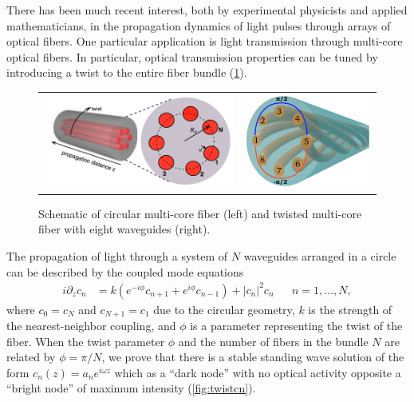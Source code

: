\documentclass[12pt,reqno,oneside]{article}
\begin{document}
There has been much recent interest, both by experimental physicists and applied mathematicians, in the propagation dynamics of light pulses through arrays of optical fibers. One particular application is light transmission through multi-core optical fibers. In particular, optical transmission properties can be tuned by introducing a twist to the entire fiber bundle \cite{Longhi2016,CastroCastro2016,Parto2017} (\cref{fig:twist}).
\begin{figure}[H]
\begin{center}
\begin{tabular}{cc}
\includegraphics[width=7.5cm]{images/twist2.png} &
\includegraphics[width=5cm]{images/twistmulticore.png}
\end{tabular}
\end{center}
\caption{Schematic of circular multi-core fiber \cite{Longhi2016} (left) and twisted multi-core fiber with eight waveguides \cite{Parto2017} (right).}
\label{fig:twist}
\end{figure}
The propagation of light through a system of $N$ waveguides arranged in a circle can be described by the coupled mode equations
\begin{align*}
i \partial_z c_n &= k \left(e^{-i\phi}c_{n+1} + e^{i\phi}c_{n-1}\right) + |c_n|^2 c_n &&  n = 1, \dots, N,
\end{align*}
 where $c_0 = c_{N}$ and $c_{N+1} = c_1$ due to the circular geometry, $k$ is the strength of the nearest-neighbor coupling, and $\phi$ is a parameter representing the twist of the fiber.  When the twist parameter $\phi$ and the number of fibers in the bundle $N$ are related by $\phi = \pi/N$, we prove that there is a stable standing wave solution of the form $c_n(z) = a_n e^{i \omega z}$ which as a ``dark node'' with no optical activity opposite a ``bright node'' of maximum intensity \cite{ParkerTwist} (\cref{fig:twistcn}). 
\end{document}
